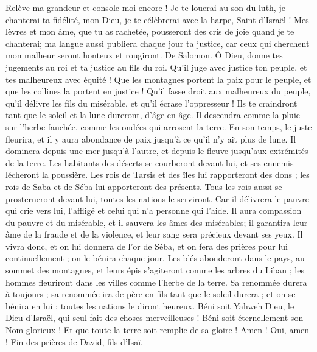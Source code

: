 \begin{multicols}{2}
Relève ma grandeur et console-moi encore !
Je te louerai au son du luth, je chanterai ta fidélité, mon Dieu, je te célèbrerai avec la harpe, Saint d'Israël !
Mes lèvres et mon âme, que tu as rachetée, pousseront des cris de joie quand je te chanterai;
ma langue aussi publiera chaque jour ta justice, car ceux qui cherchent mon malheur seront honteux et rougiront.
\VerseOne{}De Salomon. Ô Dieu, donne tes jugements au roi et ta justice au fils du roi.
Qu'il juge avec justice ton peuple, et tes malheureux avec équité !
Que les montagnes portent la paix pour le peuple, et que les collines la portent en justice !
Qu'il fasse droit aux malheureux du peuple, qu'il délivre les fils du misérable, et qu'il écrase l'oppresseur !
Ils te craindront tant que le soleil et la lune dureront, d'âge en âge.
Il descendra comme la pluie sur l'herbe fauchée, comme les ondées qui arrosent la terre.
En son temps, le juste fleurira, et il y aura abondance de paix jusqu'à ce qu'il n'y ait plus de lune.
Il dominera depuis une mer jusqu'à l'autre, et depuis le fleuve jusqu'aux extrémités de la terre.
Les habitants des déserts se courberont devant lui, et ses ennemis lécheront la poussière.
Les rois de Tarsis et des îles lui rapporteront des dons ; les rois de Saba et de Séba lui apporteront des présents.
Tous les rois aussi se prosterneront devant lui, toutes les nations le serviront.
Car il délivrera le pauvre qui crie vers lui, l'affligé et celui qui n'a personne qui l'aide.
Il aura compassion du pauvre et du misérable, et il sauvera les âmes des misérables;
il garantira leur âme de la fraude et de la violence, et leur sang sera précieux devant ses yeux.
Il vivra donc, et on lui donnera de l'or de Séba, et on fera des prières pour lui continuellement ; on le bénira chaque jour.
Les blés abonderont dans le pays, au sommet des montagnes, et leurs épis s'agiteront comme les arbres du Liban ; les hommes fleuriront dans les villes comme l'herbe de la terre.
Sa renommée durera à toujours ; sa renommée ira de père en fils tant que le soleil durera ; et on se bénira en lui ; toutes les nations le diront heureux.
Béni soit Yahweh Dieu, le Dieu d'Israël, qui seul fait des choses merveilleuses !
Béni soit éternellement son Nom glorieux ! Et que toute la terre soit remplie de sa gloire ! Amen ! Oui, amen !
Fin des prières de David, fils d'Isaï.

\end{multicols}
